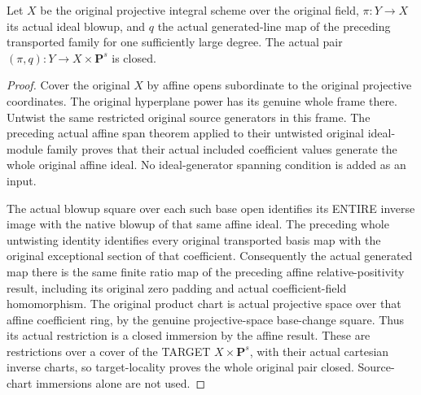 \begin{lemma}
\label{lem:kn-nadel-nef-big-global-pair-closed}
\notready
{}
Let $X$ be the original projective integral scheme over the original field,
$\pi:Y\to X$ its actual ideal blowup, and $q$ the actual generated-line
map of the preceding transported family for one sufficiently large degree.
The actual pair $(\pi,q):Y\to X\times\mathbf P^s$ is closed.
\end{lemma}
\begin{proof}
Cover the original $X$ by affine opens subordinate to the original
projective coordinates. The original hyperplane power has its genuine
whole frame there. Untwist the same restricted original source generators
in this frame. The preceding actual affine span theorem applied to their untwisted
original ideal-module family proves that their actual included coefficient
values generate the whole original affine ideal. No ideal-generator spanning condition is added as an input.

The actual blowup square over each such base open identifies its ENTIRE
inverse image with the native blowup of that same affine ideal. The
preceding whole untwisting identity identifies every original transported
basis map with the original exceptional section of that coefficient.
Consequently the actual generated map there is the same finite ratio
map of the preceding affine relative-positivity result, including its
original zero padding and actual coefficient-field homomorphism.
The original product chart is actual projective space over that affine
coefficient ring, by the genuine projective-space base-change square.
Thus its actual restriction is a closed immersion by the affine result.
These are restrictions over a cover of the TARGET $X\times\mathbf P^s$,
with their actual cartesian inverse charts, so target-locality proves the
whole original pair closed. Source-chart immersions alone are not used.
\end{proof}

